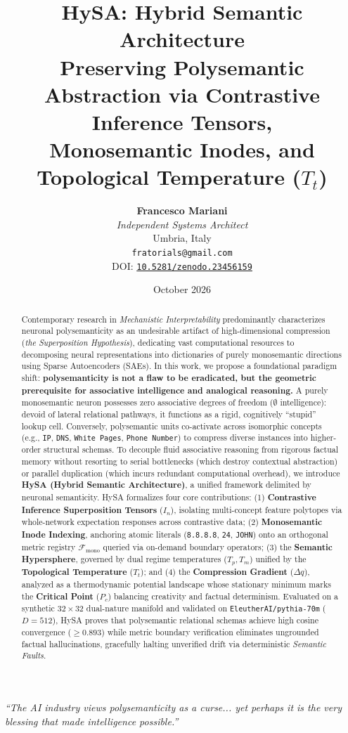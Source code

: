 \documentclass[11pt,a4paper]{article}
\title{\vspace{-1.1cm}\textbf{\Large HySA: Hybrid Semantic Architecture \\ Preserving Polysemantic Abstraction via Contrastive Inference Tensors, \\ Monosemantic Inodes, and Topological Temperature \texorpdfstring{($T_t$)}{(Tt)}}}
\author{
    \textbf{Francesco Mariani} \\
    \textit{Independent Systems Architect} \\
    Umbria, Italy \\
    \texttt{fratorials@gmail.com} \\
    {\footnotesize DOI: \href{https://doi.org/10.5281/zenodo.23456159}{\texttt{10.5281/zenodo.23456159}}}
}
\date{October 2026}
\theoremstyle{definition}
\begin{document}
\maketitle
\begin{center}
    \vspace{-0.35cm}
    \textit{``The AI industry views polysemanticity as a curse... yet perhaps it is the very blessing that made intelligence possible.''}
    \vspace{0.25cm}
\end{center}
\begin{abstract}
  \noindent Contemporary research in \textit{Mechanistic Interpretability} predominantly characterizes neuronal polysemanticity as an undesirable artifact of high-dimensional compression (\textit{the Superposition Hypothesis}), dedicating vast computational resources to decomposing neural representations into dictionaries of purely monosemantic directions using Sparse Autoencoders (SAEs). In this work, we propose a foundational paradigm shift: \textbf{polysemanticity is not a flaw to be eradicated, but the geometric prerequisite for associative intelligence and analogical reasoning.} A purely monosemantic neuron possesses zero associative degrees of freedom ($\emptyset$ intelligence): devoid of lateral relational pathways, it functions as a rigid, cognitively ``stupid'' lookup cell. Conversely, polysemantic units co-activate across isomorphic concepts (e.g., \texttt{IP}, \texttt{DNS}, \texttt{White Pages}, \texttt{Phone Number}) to compress diverse instances into higher-order structural schemas. To decouple fluid associative reasoning from rigorous factual memory without resorting to serial bottlenecks (which destroy contextual abstraction) or parallel duplication (which incurs redundant computational overhead), we introduce \textbf{HySA (Hybrid Semantic Architecture)}, a unified framework delimited by neuronal semanticity. HySA formalizes four core contributions: (1) \textbf{Contrastive Inference Superposition Tensors} ($I_n$), isolating multi-concept feature polytopes via whole-network expectation responses across contrastive data; (2) \textbf{Monosemantic Inode Indexing}, anchoring atomic literals (\texttt{8.8.8.8}, \texttt{24}, \texttt{JOHN}) onto an orthogonal metric registry $\mathcal{F}_{\mathrm{mono}}$ queried via on-demand boundary operators; (3) the \textbf{Semantic Hypersphere}, governed by dual regime temperatures ($T_p, T_m$) unified by the \textbf{Topological Temperature} ($T_t$); and (4) the \textbf{Compression Gradient} ($\Delta q$), analyzed as a thermodynamic potential landscape whose stationary minimum marks the \textbf{Critical Point} ($P_c$) balancing creativity and factual determinism. Evaluated on a synthetic $32 \times 32$ dual-nature manifold and validated on \texttt{EleutherAI/pythia-70m} ($D=512$), HySA proves that polysemantic relational schemas achieve high cosine convergence ($\ge 0.893$) while metric boundary verification eliminates ungrounded factual hallucinations, gracefully halting unverified drift via deterministic \textit{Semantic Faults}.
  \vspace{0.35cm}
\end{abstract}
\end{document}
